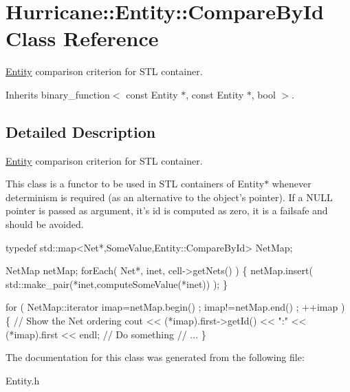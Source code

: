 \hypertarget{structHurricane_1_1Entity_1_1CompareById}{\section{Hurricane\-:\-:Entity\-:\-:Compare\-By\-Id Class Reference}
\label{structHurricane_1_1Entity_1_1CompareById}
}


\hyperlink{classHurricane_1_1Entity}{Entity} comparison criterion for S\-T\-L container.  




Inherits binary\-\_\-function$<$ const Entity $\ast$, const Entity $\ast$, bool $>$.



\subsection{Detailed Description}
\hyperlink{classHurricane_1_1Entity}{Entity} comparison criterion for S\-T\-L container. 

This class is a functor to be used in S\-T\-L containers of {\ttfamily Entity$\ast$} whenever determinism is required (as an alternative to the object's pointer). If a {\ttfamily N\-U\-L\-L} pointer is passed as argument, it's {\ttfamily id} is computed as zero, it is a failsafe and should be avoided.


\begin{DoxyCode}
\textcolor{keyword}{typedef}  std::map<Net*,SomeValue,Entity::CompareById>  NetMap;

NetMap  netMap;
forEach( Net*, inet, cell->getNets() ) \{
  netMap.insert( std::make\_pair(*inet,computeSomeValue(*inet)) );
\}

\textcolor{keywordflow}{for} ( NetMap::iterator imap=netMap.begin() ; imap!=netMap.end() ; ++imap ) \{
  \textcolor{comment}{// Show the Net ordering}
  cout << (*imap).first->getId() << \textcolor{stringliteral}{":"} << (*imap).first << endl;
  \textcolor{comment}{// Do something}
  \textcolor{comment}{// ...}
\}
\end{DoxyCode}
 

The documentation for this class was generated from the following file\-:\begin{DoxyCompactItemize}
\item 
Entity.\-h\end{DoxyCompactItemize}
